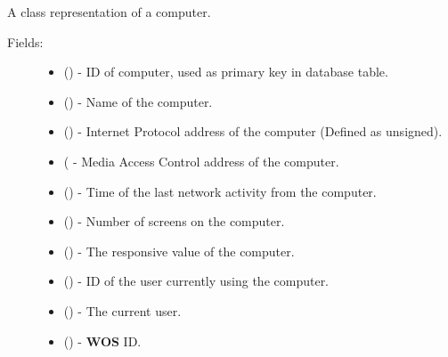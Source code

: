\documentclass[letterpaper,10pt,english]{sphinxmanual}
\begin{document}
\begin{fulllineitems}
\label{models:models.Computer}
A class representation of a computer.
\begin{description}
\item[{Fields:}] \leavevmode\begin{itemize}
\item {} 
        ()        - ID of computer, used as primary key in database table.

\item {} 
        ()        - Name of the computer.

\item {} 
        ()        - Internet Protocol address of the computer (Defined as unsigned).

\item {} 
        (        - Media Access Control address of the computer.

\item {} 
        ()        - Time of the last network activity from the computer.

\item {} 
        ()        - Number of screens on the computer.

\item {} 
        ()        - The responsive value of the computer.

\item {} 
        ()        - ID of the user currently using the computer.

\item {} 
 ()        - The current user.

\item {} 
        ()        - \textbf{WOS} ID.

\end{itemize}

\end{description}

\end{fulllineitems}
\end{document}
